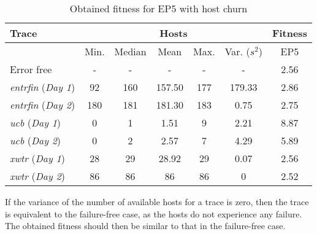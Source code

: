 \documentclass[graybox]{sty/svmult}
\begin{document}
\begin{table*}
    \caption{Obtained fitness for EP5 with host churn}
\begin{center}
    \begin{tabular}{|l|c|c|c|c|c|c|}
        \hline Trace                       & \multicolumn{5}{c|}{Hosts}                                 & \multicolumn{1}{c|}{Fitness} \\     
        \hline                             & Min. & Median & Mean   &  Max.  &  Var. ($s^2$)  &  EP5              \\
        \hline Error free                  & -       & -      & -      &  -        &  -                 & 2.56     \\            
        \hline \emph{entrfin} (\emph{Day 1})  & 92      & 160    & 157.50 &  177      &  179.33            & 2.86     \\ 
        \hline \emph{entrfin} (\emph{Day 2})  & 180     & 181    & 181.30 &  183      &  0.75              & 2.75     \\ 
        \hline \emph{ucb} (\emph{Day 1})      & 0       & 1      & 1.51   &  9        &  2.21              & 8.87     \\
        \hline \emph{ucb} (\emph{Day 2})      & 0       & 2      & 2.57   &  7        &  4.29              & 5.89     \\
        \hline \emph{xwtr} (\emph{Day 1})     & 28      & 29     & 28.92  &  29       &  0.07              & 2.56     \\           
        \hline \emph{xwtr} (\emph{Day 2})     & 86      & 86     & 86     &  86       &  0                 & 2.52     \\           
        \hline     
\end{tabular}     
\end{center}
\label{tab:fitness-with-return}
\end{table*}
If the variance of the number of available hosts for a trace is zero,
then the trace is equivalent to the failure-free case, as the hosts
do not experience any failure. The obtained fitness should then
be similar to that in the failure-free case.  
\end{document}
